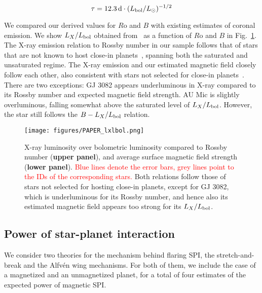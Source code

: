 \documentclass[twocolumn]{aastex631}
\begin{document}
\begin{equation}
    \tau = 12.3\, \mathrm{d} \cdot (L_{\rm bol}/L_\odot)^{-1/2}
\end{equation}

We compared our derived values for $R$o and $B$ with existing estimates of coronal emission. We show $L_X/L_{\rm bol}$ obtained from~\citet{foster2022exoplanet} as a function of $R$o and $B$ in Fig.~\ref{fig:lx}. The X-ray emission relation to Rossby number in our sample follows that of stars that are not known to host close-in planets~\citep{wright2011stellaractivityrotation}, spanning both the saturated and unsaturated regime. The X-ray emission and our estimated magnetic field closely follow each other, also consistent with stars not selected for close-in planets~\citep{reiners2022magnetism}. There are two exceptions: GJ 3082 appears underluminous in X-ray compared to its Rossby number and expected magnetic field strength. AU Mic is slightly overluminous, falling somewhat above the saturated level of $L_X/L_{\rm bol}$. However, the star still follows the $B-L_X/L_{\rm bol}$ relation.  

\begin{figure}[ht!]
    \begin{centering}
        \texttt{[image: figures/PAPER\_lxlbol.png]}
        \caption{
           X-ray luminosity over bolometric luminosity compared to Rossby number (\textbf{upper panel}), and average surface magnetic field strength (\textbf{lower panel}). \textcolor{red}{Blue lines denote the error bars, grey lines point to the IDs of the corresponding stars.} Both relations follow those of stars not selected for hosting close-in planets, except for GJ 3082, which is underluminous for its Rossby number, and hence also its estimated magnetic field appears too strong for its $L_X/L_{\rm bol}$.
        }
        \label{fig:lx}
    \end{centering}
\end{figure}

\subsection{Power of star-planet interaction}
\label{sec:methods:pspi}
We consider two theories for the mechanism behind flaring SPI, the stretch-and-break and the Alfv\'en wing mechanisms. For both of them, we include the case of a magnetized and an unmagnetized planet, for a total of four estimates of the expected power of magnetic SPI.
\end{document}
